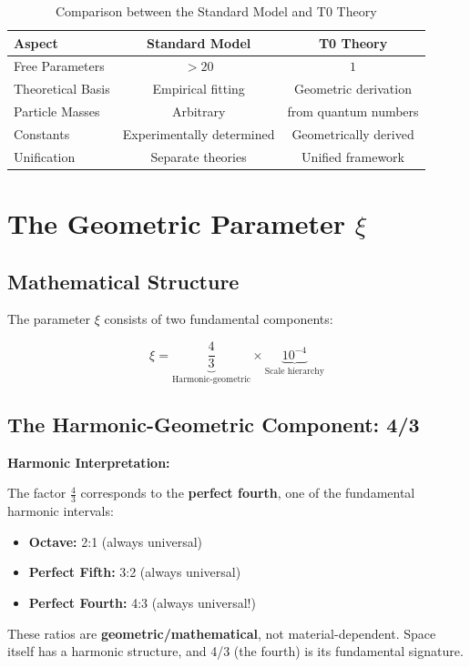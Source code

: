 \documentclass[12pt,a4paper]{article}
\begin{document}
	\begin{table}[htbp]
		\centering
		
		\begin{tabular}{lcc}
			\toprule
			\textbf{Aspect} & \textbf{Standard Model} & \textbf{T0 Theory} \\
			\midrule
			Free Parameters & $> 20$ & $1$ \\
			Theoretical Basis & Empirical fitting & Geometric derivation \\
			Particle Masses & Arbitrary & from quantum numbers \\
			Constants & Experimentally determined & Geometrically derived \\
			Unification & Separate theories & Unified framework \\
			\bottomrule
		\end{tabular}
		\caption{Comparison between the Standard Model and T0 Theory}
	\end{table}
	
	\section{The Geometric Parameter $\xi$}
	
	\subsection{Mathematical Structure}
	
	The parameter $\xi$ consists of two fundamental components:
	
	\begin{equation}
		\xi = \underbrace{\frac{4}{3}}_{\text{Harmonic-geometric}} \times \underbrace{10^{-4}}_{\text{Scale hierarchy}}
		\label{eq:xi_components}
	\end{equation}
	
	\subsection{The Harmonic-Geometric Component: 4/3}
	
	\begin{alternative}
		\textbf{Harmonic Interpretation:}
		
		The factor $\frac{4}{3}$ corresponds to the \textbf{perfect fourth}, one of the fundamental harmonic intervals:
		\begin{itemize}
			\item \textbf{Octave:} 2:1 (always universal)
			\item \textbf{Perfect Fifth:} 3:2 (always universal)  
			\item \textbf{Perfect Fourth:} 4:3 (always universal!)
		\end{itemize}
		
		These ratios are \textbf{geometric/mathematical}, not material-dependent. Space itself has a harmonic structure, and 4/3 (the fourth) is its fundamental signature.
	\end{alternative}
	
\end{document}
